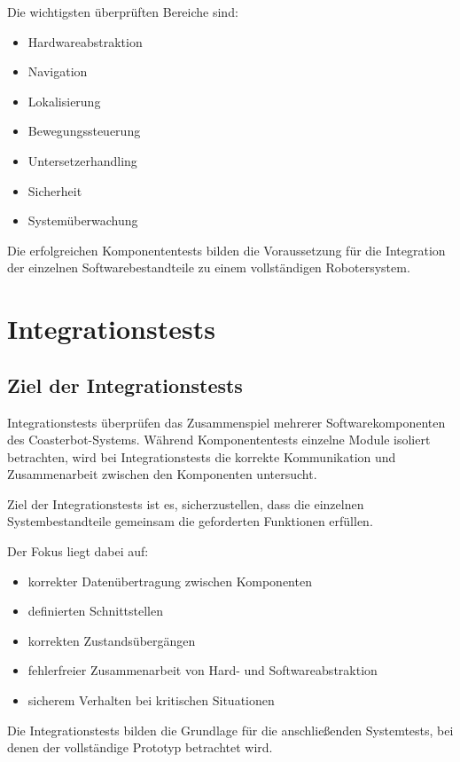 \documentclass[
  a4paper,
  12pt,
  DIV=12,        %
  parskip=half,  %
  headings=small %
]{scrartcl}
\theoremstyle{definition}
\providecommand{\tightlist}{%
  \setlength{\itemsep}{0pt}\setlength{\parskip}{0pt}}
\theoremstyle{definition}
\begin{document}
Die wichtigsten überprüften Bereiche sind:

\begin{itemize}
\tightlist
\item
  Hardwareabstraktion
\item
  Navigation
\item
  Lokalisierung
\item
  Bewegungssteuerung
\item
  Untersetzerhandling
\item
  Sicherheit
\item
  Systemüberwachung
\end{itemize}

Die erfolgreichen Komponententests bilden die Voraussetzung für die
Integration der einzelnen Softwarebestandteile zu einem vollständigen
Robotersystem.

\section{Integrationstests}\label{integrationstests-1}

\subsection{Ziel der
Integrationstests}\label{ziel-der-integrationstests}

Integrationstests überprüfen das Zusammenspiel mehrerer
Softwarekomponenten des Coasterbot-Systems. Während Komponententests
einzelne Module isoliert betrachten, wird bei Integrationstests die
korrekte Kommunikation und Zusammenarbeit zwischen den Komponenten
untersucht.

Ziel der Integrationstests ist es, sicherzustellen, dass die einzelnen
Systembestandteile gemeinsam die geforderten Funktionen erfüllen.

Der Fokus liegt dabei auf:

\begin{itemize}
\tightlist
\item
  korrekter Datenübertragung zwischen Komponenten
\item
  definierten Schnittstellen
\item
  korrekten Zustandsübergängen
\item
  fehlerfreier Zusammenarbeit von Hard- und Softwareabstraktion
\item
  sicherem Verhalten bei kritischen Situationen
\end{itemize}

Die Integrationstests bilden die Grundlage für die anschließenden
Systemtests, bei denen der vollständige Prototyp betrachtet wird.
\end{document}
